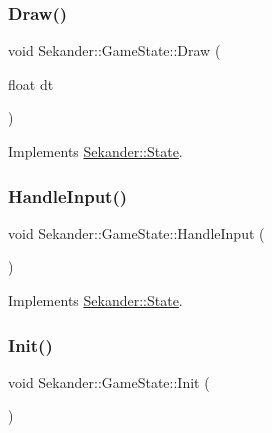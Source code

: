 \subsubsection{\texorpdfstring{Draw()}{Draw()}}
{\footnotesize\ttfamily void Sekander\+::\+Game\+State\+::\+Draw (\begin{DoxyParamCaption}\item[{float}]{dt }\end{DoxyParamCaption})\hspace{0.3cm}{\ttfamily [virtual]}}



Implements \hyperlink{classSekander_1_1State_a6ae7c2de1985461232a3ad694ca736b5}{Sekander\+::\+State}.

\mbox{\label{classSekander_1_1GameState_ab3e0961a77a513cdc49fe8e6b3962280}} 
\subsubsection{\texorpdfstring{Handle\+Input()}{HandleInput()}}
{\footnotesize\ttfamily void Sekander\+::\+Game\+State\+::\+Handle\+Input (\begin{DoxyParamCaption}{ }\end{DoxyParamCaption})\hspace{0.3cm}{\ttfamily [virtual]}}



Implements \hyperlink{classSekander_1_1State_ad55ae42f5887db5745fda9f2bd30aaa3}{Sekander\+::\+State}.

\mbox{\label{classSekander_1_1GameState_af27f06a5535b1fbc2f52299a1eb3bee2}} 
\subsubsection{\texorpdfstring{Init()}{Init()}}
{\footnotesize\ttfamily void Sekander\+::\+Game\+State\+::\+Init (\begin{DoxyParamCaption}{ }\end{DoxyParamCaption})\hspace{0.3cm}{\ttfamily [virtual]}}



